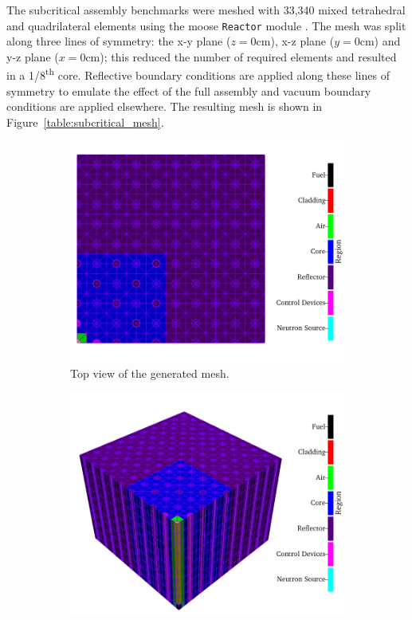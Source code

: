 The subcritical assembly benchmarks were meshed with 33,340 mixed tetrahedral and quadrilateral elements using the \acrshort{moose} \texttt{Reactor} module \cite{moose_reactor}. The mesh was split along three lines of symmetry: the x-y plane ($z = 0\text{cm}$), x-z plane ($y = 0\text{cm}$) and y-z plane ($x = 0\text{cm}$); this reduced the number of required elements and resulted in a 1/8\textsuperscript{th} core. Reflective boundary conditions are applied along these lines of symmetry to emulate the effect of the full assembly and vacuum boundary conditions are applied elsewhere. The resulting mesh is shown in Figure~\ref{table:subcritical_mesh}. 
\begin{figure}[H]
    \centering
    \begin{subfigure}[b]{0.48\textwidth}
        \centering
        \includegraphics[width=\textwidth]{images/verification/subcritical/mesh/mesh_top.png}
        \caption{Top view of the generated mesh.}
        \label{table:subcritical_mesh_top}
    \end{subfigure}
    \hfill
    \begin{subfigure}[b]{0.48\textwidth}
        \centering
        \includegraphics[width=\textwidth]{images/verification/subcritical/mesh/mesh_iso.png}

\end{subfigure}
\end{figure}
